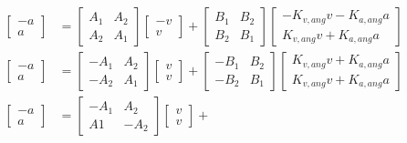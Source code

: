 \begin{align*}
  \begin{bmatrix}
    -a \\
    a
  \end{bmatrix} &=
    \begin{bmatrix}
      A_1 & A_2 \\
      A_2 & A_1
    \end{bmatrix}
    \begin{bmatrix}
      -v \\
      v
    \end{bmatrix} +
    \begin{bmatrix}
      B_1 & B_2 \\
      B_2 & B_1
    \end{bmatrix}
    \begin{bmatrix}
      -K_{v,ang} v - K_{a,ang} a \\
      K_{v,ang} v + K_{a,ang} a
    \end{bmatrix} \\
  \begin{bmatrix}
    -a \\
    a
  \end{bmatrix} &=
    \begin{bmatrix}
      -A_1 & A_2 \\
      -A_2 & A_1
    \end{bmatrix}
    \begin{bmatrix}
      v \\
      v
    \end{bmatrix} +
    \begin{bmatrix}
      -B_1 & B_2 \\
      -B_2 & B_1
    \end{bmatrix}
    \begin{bmatrix}
      K_{v,ang} v + K_{a,ang} a \\
      K_{v,ang} v + K_{a,ang} a
    \end{bmatrix} \\
  \begin{bmatrix}
    -a \\
    a
  \end{bmatrix} &=
    \begin{bmatrix}
      -A_1 & A_2 \\
      A1 & -A_2
    \end{bmatrix}
    \begin{bmatrix}
      v \\
      v
    \end{bmatrix} +

\end{align*}
